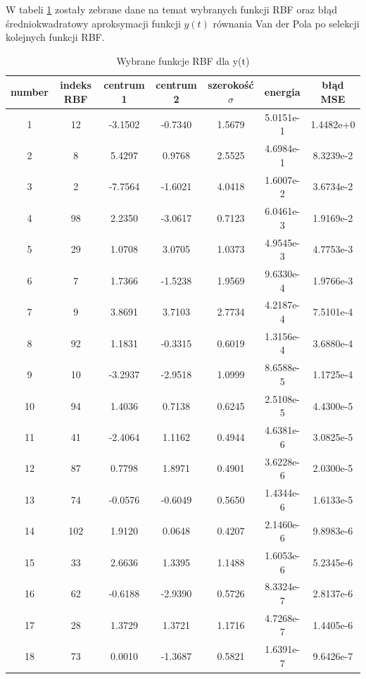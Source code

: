 W tabeli \ref{tab:rbf_tabela_x1} zostały zebrane dane na temat wybranych funkcji RBF oraz błąd średniokwadratowy aproksymacji funkcji $y(t)$ równania Van der Pola po selekcji kolejnych funkcji RBF.
\begin{table}[ht!]
\centering

\begin{tabular}{ | c| c| c| c| c| c| c| }
\hline
number & indeks RBF & centrum 1 & centrum 2 & szerokość $\sigma$ & energia      & błąd MSE \\ \hline    	
  1 &  12  & -3.1502 &  -0.7340 &   1.5679  &  5.0151e-1 & 1.4482e+0 \\
  2 &   8  &  5.4297 &   0.9768 &   2.5525  &  4.6984e-1 & 8.3239e-2 \\
  3 &   2  & -7.7564 &  -1.6021 &   4.0418  &  1.6007e-2 & 3.6734e-2 \\
  4 &  98  &  2.2350 &  -3.0617 &   0.7123  &  6.0461e-3 & 1.9169e-2 \\
  5 &  29  &  1.0708 &   3.0705 &   1.0373  &  4.9545e-3 & 4.7753e-3 \\
  6 &   7  &  1.7366 &  -1.5238 &   1.9569  &  9.6330e-4 & 1.9766e-3 \\
  7 &   9  &  3.8691 &   3.7103 &   2.7734  &  4.2187e-4 & 7.5101e-4 \\
  8 &  92  &  1.1831 &  -0.3315 &   0.6019  &  1.3156e-4 & 3.6880e-4 \\
  9 &  10  & -3.2937 &  -2.9518 &   1.0999  &  8.6588e-5 & 1.1725e-4 \\
 10 &  94  &  1.4036 &   0.7138 &   0.6245  &  2.5108e-5 & 4.4300e-5 \\
 11 &  41  & -2.4064 &   1.1162 &   0.4944  &  4.6381e-6 & 3.0825e-5 \\
 12 &  87  &  0.7798 &   1.8971 &   0.4901  &  3.6228e-6 & 2.0300e-5 \\
 13 &  74  & -0.0576 &  -0.6049 &   0.5650  &  1.4344e-6 & 1.6133e-5 \\
 14 & 102  &  1.9120 &   0.0648 &   0.4207  &  2.1460e-6 & 9.8983e-6 \\
 15 &  33  &  2.6636 &   1.3395 &   1.1488  &  1.6053e-6 & 5.2345e-6 \\
 16 &  62  & -0.6188 &  -2.9390 &   0.5726  &  8.3324e-7 & 2.8137e-6 \\
 17 &  28  &  1.3729 &   1.3721 &   1.1716  &  4.7268e-7 & 1.4405e-6 \\
 18 &  73  &  0.0010 &  -1.3687 &   0.5821  &  1.6391e-7 & 9.6426e-7 \\
    \hline
\end{tabular}

\caption{Wybrane funkcje RBF dla y(t)}
\label{tab:rbf_tabela_x1}
\end{table}

